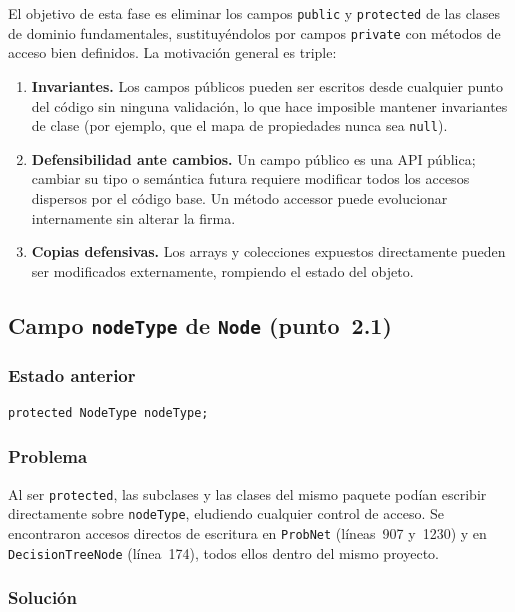 \documentclass[11pt,a4paper]{article}
\newcommand{\code}[1]{\texttt{#1}}
\begin{document}
El objetivo de esta fase es eliminar los campos \code{public} y
\code{protected} de las clases de dominio fundamentales, sustituyéndolos
por campos \code{private} con métodos de acceso bien definidos. La
motivación general es triple:

\begin{enumerate}
  \item \textbf{Invariantes.} Los campos públicos pueden ser escritos
    desde cualquier punto del código sin ninguna validación, lo que hace
    imposible mantener invariantes de clase (por ejemplo, que el mapa de
    propiedades nunca sea \code{null}).
  \item \textbf{Defensibilidad ante cambios.} Un campo público es una
    API pública; cambiar su tipo o semántica futura requiere modificar
    todos los accesos dispersos por el código base. Un método accessor
    puede evolucionar internamente sin alterar la firma.
  \item \textbf{Copias defensivas.} Los arrays y colecciones expuestos
    directamente pueden ser modificados externamente, rompiendo el estado
    del objeto.
\end{enumerate}

\subsection{Campo \code{nodeType} de \code{Node} (punto~2.1)}

\subsubsection*{Estado anterior}

\begin{lstlisting}
protected NodeType nodeType;
\end{lstlisting}

\subsubsection*{Problema}

Al ser \code{protected}, las subclases y las clases del mismo paquete
podían escribir directamente sobre \code{nodeType}, eludiendo cualquier
control de acceso. Se encontraron accesos directos de escritura en
\code{ProbNet} (líneas~907 y~1230) y en \code{DecisionTreeNode}
(línea~174), todos ellos dentro del mismo proyecto.

\subsubsection*{Solución}
\end{document}
